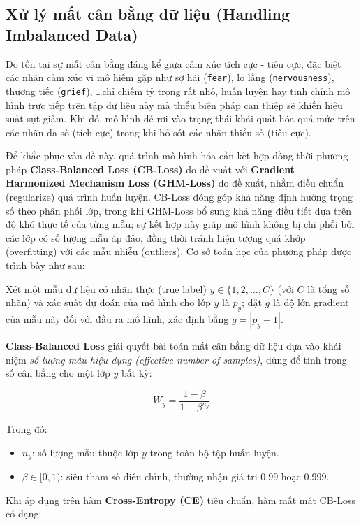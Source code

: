 \subsection{Xử lý mất cân bằng dữ liệu (Handling Imbalanced Data)}
Do tồn tại sự mất cân bằng đáng kể giữa cảm xúc tích cực - tiêu cực, đặc biệt các nhãn cảm xúc vi mô hiếm gặp như sợ hãi (\texttt{fear}), lo lắng (\texttt{nervousness}), thương tiếc (\texttt{grief}), \dots chỉ chiếm tỷ trọng rất nhỏ, huấn luyện hay tinh chỉnh mô hình trực tiếp trên tập dữ liệu này mà thiếu biện pháp can thiệp sẽ khiến hiệu suất sụt giảm. Khi đó, mô hình dễ rơi vào trạng thái khái quát hóa quá mức trên các nhãn đa số (tích cực) trong khi bỏ sót các nhãn thiểu số (tiêu cực).

Để khắc phục vấn đề này, quá trình mô hình hóa cần kết hợp đồng thời phương pháp \textbf{Class-Balanced Loss (CB-Loss)} do \textcite{cui2019class} đề xuất với \textbf{Gradient Harmonized Mechanism Loss (GHM-Loss)} do \textcite{li2019gradient} đề xuất, nhằm điều chuẩn (regularize) quá trình huấn luyện. CB-Loss đóng góp khả năng định hướng trọng số theo phân phối lớp, trong khi GHM-Loss bổ sung khả năng điều tiết dựa trên độ khó thực tế của từng mẫu; sự kết hợp này giúp mô hình không bị chi phối bởi các lớp có số lượng mẫu áp đảo, đồng thời tránh hiện tượng quá khớp (overfitting) với các mẫu nhiễu (outliers). Cơ sở toán học của phương pháp được trình bày như sau:

Xét một mẫu dữ liệu có nhãn thực (true label) $y \in \{1, 2, \dots, C\}$ (với $C$ là tổng số nhãn) và xác suất dự đoán của mô hình cho lớp $y$ là $p_{y}$; đặt $g$ là độ lớn gradient của mẫu này đối với đầu ra mô hình, xác định bằng $g = |p_{y} - 1|$.

\textbf{Class-Balanced Loss} giải quyết bài toán mất cân bằng dữ liệu dựa vào khái niệm \textit{số lượng mẫu hiệu dụng (effective number of samples)}, dùng để tính trọng số cân bằng cho một lớp $y$ bất kỳ:

$$W_{y} = \frac{1 - \beta}{1 - \beta^{n_{y}}}$$

Trong đó:
\begin{itemize}[label=-]
    \item $n_{y}$: số lượng mẫu thuộc lớp $y$ trong toàn bộ tập huấn luyện.
    \item $\beta \in [0, 1)$: siêu tham số điều chỉnh, thường nhận giá trị $0.99$ hoặc $0.999$.
\end{itemize}

Khi áp dụng trên hàm \textbf{Cross-Entropy (CE)} tiêu chuẩn, hàm mất mát CB-Loss có dạng:

